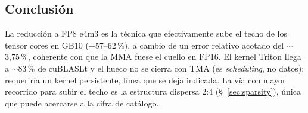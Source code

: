 \subsection{Conclusión}

La reducción a FP8 e4m3 es la técnica que efectivamente sube el techo de los tensor
cores en GB10 ($+57$--$62\,\%$), a cambio de un error relativo acotado del $\sim$3{,}75\,\%,
coherente con que la MMA fuese el cuello en FP16. El kernel Triton llega a $\sim$83\,\% de
cuBLASLt y el hueco no se cierra con TMA (es \emph{scheduling}, no datos): requeriría un
kernel persistente, línea que se deja indicada. La vía con mayor recorrido para subir el
techo es la estructura dispersa 2:4 (§~\ref{sec:sparsity}), única que puede acercarse a la
cifra de catálogo.
